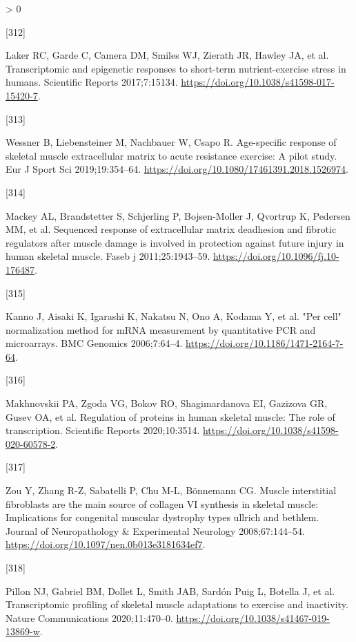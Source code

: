 \documentclass[twoside,10pt]{gihclass} %
\newlength{\cslhangindent}
\newlength{\csllabelwidth}
\newenvironment{CSLReferences}[3] %
 {%
  \setlength{\parindent}{0pt}
  \ifodd #1 \everypar{\setlength{\hangindent}{\cslhangindent}}\ignorespaces\fi
  \ifnum #2 > 0
  \setlength{\parskip}{#2\baselineskip}
  \fi
 }%
 {}
\newcommand{\CSLLeftMargin}[1]{\parbox[t]{\maxof{\widthof{#1}}{\csllabelwidth}}{#1}}
\newcommand{\CSLRightInline}[1]{\parbox[t]{\linewidth}{#1}}
\begin{document}
\begin{CSLReferences}{0}{0}
\leavevmode\hypertarget{ref-RN2401}{}%
\CSLLeftMargin{{[}312{]} }
\CSLRightInline{Laker RC, Garde C, Camera DM, Smiles WJ, Zierath JR, Hawley JA, et al. Transcriptomic and epigenetic responses to short-term nutrient-exercise stress in humans. Scientific Reports 2017;7:15134. \url{https://doi.org/10.1038/s41598-017-15420-7}.}

\leavevmode\hypertarget{ref-RN2451}{}%
\CSLLeftMargin{{[}313{]} }
\CSLRightInline{Wessner B, Liebensteiner M, Nachbauer W, Csapo R. Age-specific response of skeletal muscle extracellular matrix to acute resistance exercise: A pilot study. Eur J Sport Sci 2019;19:354--64. \url{https://doi.org/10.1080/17461391.2018.1526974}.}

\leavevmode\hypertarget{ref-RN2453}{}%
\CSLLeftMargin{{[}314{]} }
\CSLRightInline{Mackey AL, Brandstetter S, Schjerling P, Bojsen-Moller J, Qvortrup K, Pedersen MM, et al. Sequenced response of extracellular matrix deadhesion and fibrotic regulators after muscle damage is involved in protection against future injury in human skeletal muscle. Faseb j 2011;25:1943--59. \url{https://doi.org/10.1096/fj.10-176487}.}

\leavevmode\hypertarget{ref-RN2182}{}%
\CSLLeftMargin{{[}315{]} }
\CSLRightInline{Kanno J, Aisaki K, Igarashi K, Nakatsu N, Ono A, Kodama Y, et al. "Per cell" normalization method for mRNA measurement by quantitative PCR and microarrays. BMC Genomics 2006;7:64--4. \url{https://doi.org/10.1186/1471-2164-7-64}.}

\leavevmode\hypertarget{ref-RN2448}{}%
\CSLLeftMargin{{[}316{]} }
\CSLRightInline{Makhnovskii PA, Zgoda VG, Bokov RO, Shagimardanova EI, Gazizova GR, Gusev OA, et al. Regulation of proteins in human skeletal muscle: The role of transcription. Scientific Reports 2020;10:3514. \url{https://doi.org/10.1038/s41598-020-60578-2}.}

\leavevmode\hypertarget{ref-RN2883}{}%
\CSLLeftMargin{{[}317{]} }
\CSLRightInline{Zou Y, Zhang R-Z, Sabatelli P, Chu M-L, Bönnemann CG. Muscle interstitial fibroblasts are the main source of collagen VI synthesis in skeletal muscle: Implications for congenital muscular dystrophy types ullrich and bethlem. Journal of Neuropathology \& Experimental Neurology 2008;67:144--54. \url{https://doi.org/10.1097/nen.0b013e3181634ef7}.}

\leavevmode\hypertarget{ref-RN2360}{}%
\CSLLeftMargin{{[}318{]} }
\CSLRightInline{Pillon NJ, Gabriel BM, Dollet L, Smith JAB, Sardón Puig L, Botella J, et al. Transcriptomic profiling of skeletal muscle adaptations to exercise and inactivity. Nature Communications 2020;11:470--0. \url{https://doi.org/10.1038/s41467-019-13869-w}.}


\end{CSLReferences}
\end{document}
